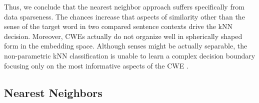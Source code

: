 \documentclass[11pt]{article}
\begin{document}
Thus, we conclude that the nearest neighbor approach suffers specifically from data sparseness.
The chances increase that aspects of similarity other than the sense of the target word in two compared sentence contexts drive the kNN decision.
Moreover, CWEs actually do not organize well in spherically shaped form in the embedding space.
Although senses might be actually separable, the non-parametric kNN classification is unable to learn a complex decision boundary focusing only on the most informative aspects of the CWE \cite[p.~4]{yuan.2016}.
 
\subsection{Nearest Neighbors}


\begin{table}
\centering
{}
\end{table}
\end{document}
